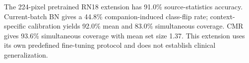 The 224-pixel pretrained RN18 extension has 91.0\% source-statistics accuracy. Current-batch BN gives a 44.8\% companion-induced class-flip rate; context-specific calibration yields 92.0\% mean and 83.0\% simultaneous coverage. CMR gives 93.6\% simultaneous coverage with mean set size 1.37. This extension uses its own predefined fine-tuning protocol and does not establish clinical generalization.